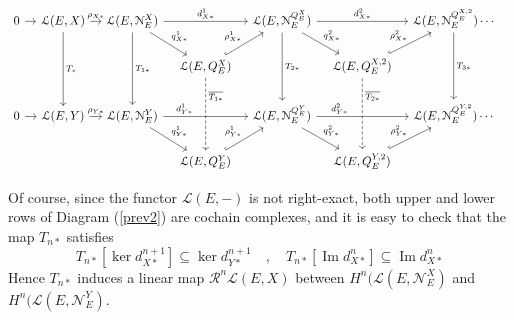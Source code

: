\documentclass[12pt,a4paper]{amsproc}
\theoremstyle{remark}
\theoremstyle{definition}
\newcommand{\cL}{\mathcal{L}}
\newcommand{\cN}{\mathcal{N}}
\renewcommand\Im{\operatorname{Im}}
\numberwithin{equation}{section}
\begin{document}
{\small \begin{equation}\label{prev2}
		\begin{tikzcd}[column sep=0.33cm]
			0 \arrow[r] & \cL(E,X) \arrow[r, "\rho_{X*}"] \arrow[dd, "T_*"] & \cL(E,\mathcal{N}_E^X) \arrow[rd, "q_{X*}^1"] \arrow[rr, "d_{X*}^1"] \arrow[dd, "T_{1*}"] &                                                                                & \cL(E,\mathcal{N}_E^{Q_E^X}) \arrow[rd, "q_{X*}^2"] \arrow[rr, "d_{X*}^2"] \arrow[dd, "T_{2*}"] &                                                                                & \cL(E,\mathcal{N}_E^{Q_E^{X,2}}) \arrow[dd, "T_{3*}"] \cdots \\
			&                                       &                                                                            & \cL(E,Q_E^X) \arrow[ru, "\rho_{X*}^1", hook] \arrow[dd, "\overline{T_{1*}}", near start, dashed] &                                                                                       & \cL(E,Q_E^{X,2}) \arrow[ru, "\rho_{X*}^2", hook] \arrow[dd, "\overline{T_{2*}}", near start, dashed] &                                                         &        \\
			0 \arrow[r] & \cL(E,Y) \arrow[r, "\rho_{Y*}"]                 & \cL(E,\mathcal{N}_E^Y) \arrow[rd, "q_{Y*}^1"] \arrow[rr, "d_{Y*}^1", near start]                   &                                                                                & \cL(E,\mathcal{N}_E^{Q_E^Y}) \arrow[rd, "q_{Y*}^2"] \arrow[rr, "d_{Y*}^2", near start]                   &                                                                                & \cL(E,\mathcal{N}_E^{Q_E^{Y,2}})                     \cdots \\
			&                                       &                                                                            & \cL(E,Q_E^Y) \arrow[ru, "\rho^{1}_{Y*}", hook]                                    &                                                                                       & \cL(E,Q_E^{Y,2}) \arrow[ru, "\rho_{Y*}^2", hook]                                      &                                                         &       
		\end{tikzcd}
\end{equation}}

Of course, since the functor $\mathcal{L}(E,-)$ is not right-exact, both upper and lower rows of Diagram (\ref{prev2}) are cochain complexes, and it is easy to check that the map $T_{n*}$ satisfies 
\[ T_{n*}[\ker d_{X*}^{n+1}] \subseteq \ker d_{Y*}^{n+1} \quad , \quad T_{n*}[\Im d^n_{X*}]\subseteq \Im d_{X*}^n\]
Hence $T_{n*}$ induces a linear map $\mathcal R^n\cL(E,X)$ between $H^n(\cL(E, \cN_E^X)$ and $H^n(\cL(E, \cN_E^Y)$.
\end{document}
